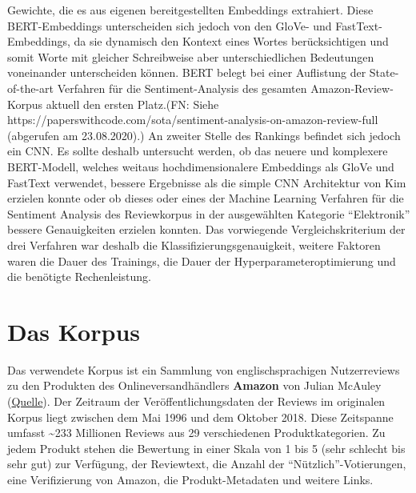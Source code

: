 \documentclass[11pt]{article}
\begin{document}
Gewichte, die es aus eigenen bereitgestellten Embeddings extrahiert.
Diese BERT-Embeddings unterscheiden sich jedoch von den GloVe- und
FastText-Embeddings, da sie dynamisch den Kontext eines Wortes
berücksichtigen und somit Worte mit gleicher Schreibweise aber
unterschiedlichen Bedeutungen voneinander unterscheiden können. BERT
belegt bei einer Auflistung der State-of-the-art Verfahren für die
Sentiment-Analysis des gesamten Amazon-Review-Korpus aktuell den ersten
Platz.(FN: Siehe
https://paperswithcode.com/sota/sentiment-analysis-on-amazon-review-full
(abgerufen am 23.08.2020).) An zweiter Stelle des Rankings befindet sich
jedoch ein CNN. Es sollte deshalb untersucht werden, ob das neuere und
komplexere BERT-Modell, welches weitaus hochdimensionalere Embeddings
als GloVe und FastText verwendet, bessere Ergebnisse als die simple CNN
Architektur von Kim erzielen konnte oder ob dieses oder eines der
Machine Learning Verfahren für die Sentiment Analysis des Reviewkorpus
in der ausgewählten Kategorie ``Elektronik'' bessere Genauigkeiten
erzielen konnten. Das vorwiegende Vergleichskriterium der drei Verfahren
war deshalb die Klassifizierungsgenauigkeit, weitere Faktoren waren die
Dauer des Trainings, die Dauer der Hyperparameteroptimierung und die
benötigte Rechenleistung.

    \hypertarget{das-korpus}{%
\section{Das Korpus}\label{das-korpus}}

Das verwendete Korpus ist ein Sammlung von englischsprachigen
Nutzerreviews zu den Produkten des Onlineversandhändlers \textbf{Amazon}
von Julian McAuley
(\href{https://nijianmo.github.io/amazon/index.html}{Quelle}). Der
Zeitraum der Veröffentlichungsdaten der Reviews im originalen Korpus
liegt zwischen dem Mai 1996 und dem Oktober 2018. Diese Zeitspanne
umfasst \textasciitilde233 Millionen Reviews aus 29 verschiedenen
Produktkategorien. Zu jedem Produkt stehen die Bewertung in einer Skala
von 1 bis 5 (sehr schlecht bis sehr gut) zur Verfügung, der Reviewtext,
die Anzahl der ``Nützlich''-Votierungen, eine Verifizierung von Amazon,
die Produkt-Metadaten und weitere Links.
\end{document}

